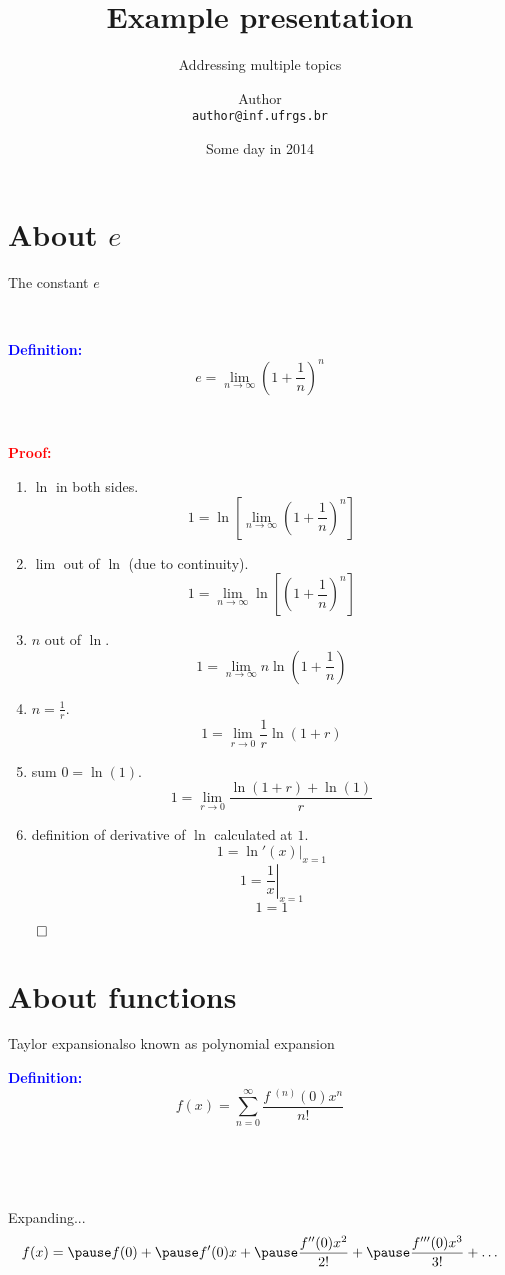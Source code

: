 \documentclass[xcolor=dvipsnames,pdf,10pt]{beamer}
\title     [Example presentation]      {Example presentation}
\subtitle                              {Addressing multiple topics}
\author    [Author]                    {Author\\ \texttt{author@inf.ufrgs.br}}
\institute                             {\inftitle}
\date                                  {Some day in 2014}
\newcommand{\be}{\begin{enumerate}}
\newcommand{\ee}{\end{enumerate}}
\newcommand{\tm}{\item}
\newcommand{\defn}{\textcolor{blue}{\textbf{\textrm{Definition:\ }}}}
\newcommand{\prf}{\textcolor{Red}{\textbf{\textrm{Proof:\ }}}}
\begin{document}
\titlepageINF

\tableofcontentsINF

\section{About $e$} 

\begin{frame}[allowframebreaks]{The constant $e$}

\ 

\defn 
\[e =   \lim_{n \to \infty} \left(1 + \frac{1}{n}\right)^n \]


\ 

\prf 
\be
\tm $\ln$ in both sides.
  \[ 1 =   \ln \left[ \lim_{n \to \infty} \left(1 + \frac{1}{n}\right)^n \right] \]
\tm $\lim$ out of $\ln$ (due to continuity).
  \[ 1 =  \lim_{n \to \infty}  \ln \left[  \left(1 + \frac{1}{n}\right)^n \right] \]
\tm $n$ out of $\ln$.
  \[ 1 =  \lim_{n \to \infty}  n \ln \left(1 + \frac{1}{n}\right)  \]
\tm $n = \frac{1}{r}$.
  \[ 1 =  \lim_{r \to 0}  \frac{1}{r} \ln (1 + r) \]
\tm sum $0 = \ln(1)$.
  \[ 1 =  \lim_{r \to 0}  \frac{ \ln (1 + r) + \ln(1)}{r} \]
\tm definition of derivative of $\ln$ calculated at $1$.
 \[ 1 =  \left. \ln'(x)\right\vert_{x=1} \]
 \[ 1 =  \left. \frac{1}{x}\right\vert_{x=1} \]
 \[ 1 = 1 \]
\ee

\hfill $\qed$
\end{frame}


\section{About functions}


\begin{frame}{Taylor expansion}{also known as polynomial expansion}



\defn 
\[  f(x) = \sum_{n=0}^{\infty} \frac{f\ \!^{(n)}(0) x^n}{n!}   \]

\pause 

\ 

\ 

Expanding...
\[ f(x) = \pause f(0) + \pause f'(0)x + \pause \frac{f''(0)x^2}{2!} + \pause \frac{f'''(0)x^3}{3!} + \ldots \]
\end{frame}
\end{document}
